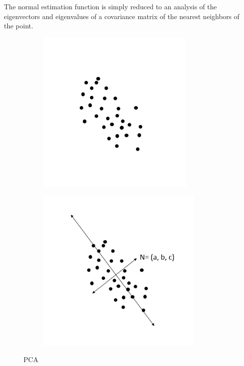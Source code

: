 		The normal estimation function is simply reduced to an analysis of the eigenvectors and eigenvalues of a covariance matrix of the nearest neighbors of the point.
		
		\begin{figure}[H]
			\centering
			\begin{subfigure}{.5\textwidth}
				\centering
				\includegraphics[width=1\linewidth]{Includes/images/pca1}
				\caption{}
				\label{fig:sub1}
			\end{subfigure}%
			\begin{subfigure}{.5\textwidth}
				\centering
				\includegraphics[width=1\linewidth]{Includes/images/pca2}
				\caption{}
				\label{fig:sub2}
			\end{subfigure}
			\caption{PCA}
			\label{fig:test}
		\end{figure} 

